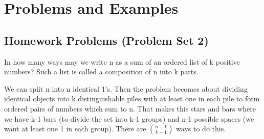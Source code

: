\label{11-0226-2}

% 






% 



\noindent


\section{Problems and Examples}

\subsection{Homework Problems (Problem Set 2)}

\begin{problem}{1}
    In how many ways may we write n as a sum of an ordered list of k positive numbers? Such a list is called a composition of n into k parts.
\end{problem}
\begin{solution}
    We can split n into n identical 1's. Then the problem becomes about dividing identical objects into k distinguishable piles with at least one in each pile to form ordered pairs of numbers which sum to n. That makes this stars and bars where we have k-1 bars (to divide the set into k-1 groups) and n-1 possible spaces (we want at least one 1 in each group). There are $\binom{n-1}{k-1}$ ways to do this.
\end{solution}

